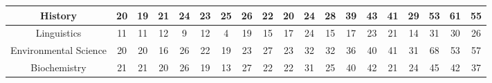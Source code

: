 \documentclass[10]{article}
\begin{document}
\begin{landscape}
\begin{longtable}[c]{|ccccccccccccccccccc|}
	\multicolumn{1}{|c|}{History}                                    & \multicolumn{1}{c|}{20}         & \multicolumn{1}{c|}{19}         & \multicolumn{1}{c|}{21}         & \multicolumn{1}{c|}{24}         & \multicolumn{1}{c|}{23}         & \multicolumn{1}{c|}{25}         & \multicolumn{1}{c|}{26}         & \multicolumn{1}{c|}{22}         & \multicolumn{1}{c|}{20}         & \multicolumn{1}{c|}{24}         & \multicolumn{1}{c|}{28}         & \multicolumn{1}{c|}{39}         & \multicolumn{1}{c|}{43}         & \multicolumn{1}{c|}{41}         & \multicolumn{1}{c|}{29}         & \multicolumn{1}{c|}{53}         & \multicolumn{1}{c|}{61}         & 55         \\ \hline
	\multicolumn{1}{|c|}{Linguistics}                                & \multicolumn{1}{c|}{11}         & \multicolumn{1}{c|}{11}         & \multicolumn{1}{c|}{12}         & \multicolumn{1}{c|}{9}          & \multicolumn{1}{c|}{12}         & \multicolumn{1}{c|}{4}          & \multicolumn{1}{c|}{19}         & \multicolumn{1}{c|}{15}         & \multicolumn{1}{c|}{17}         & \multicolumn{1}{c|}{24}         & \multicolumn{1}{c|}{15}         & \multicolumn{1}{c|}{17}         & \multicolumn{1}{c|}{23}         & \multicolumn{1}{c|}{21}         & \multicolumn{1}{c|}{14}         & \multicolumn{1}{c|}{31}         & \multicolumn{1}{c|}{30}         & 26         \\ \hline
	\multicolumn{1}{|c|}{Environmental Science}                      & \multicolumn{1}{c|}{20}         & \multicolumn{1}{c|}{20}         & \multicolumn{1}{c|}{16}         & \multicolumn{1}{c|}{26}         & \multicolumn{1}{c|}{22}         & \multicolumn{1}{c|}{19}         & \multicolumn{1}{c|}{23}         & \multicolumn{1}{c|}{27}         & \multicolumn{1}{c|}{23}         & \multicolumn{1}{c|}{32}         & \multicolumn{1}{c|}{32}         & \multicolumn{1}{c|}{36}         & \multicolumn{1}{c|}{40}         & \multicolumn{1}{c|}{41}         & \multicolumn{1}{c|}{31}         & \multicolumn{1}{c|}{68}         & \multicolumn{1}{c|}{53}         & 57         \\ \hline
	\multicolumn{1}{|c|}{Biochemistry}                               & \multicolumn{1}{c|}{21}         & \multicolumn{1}{c|}{21}         & \multicolumn{1}{c|}{20}         & \multicolumn{1}{c|}{26}         & \multicolumn{1}{c|}{19}         & \multicolumn{1}{c|}{13}         & \multicolumn{1}{c|}{27}         & \multicolumn{1}{c|}{22}         & \multicolumn{1}{c|}{22}         & \multicolumn{1}{c|}{31}         & \multicolumn{1}{c|}{25}         & \multicolumn{1}{c|}{40}         & \multicolumn{1}{c|}{42}         & \multicolumn{1}{c|}{21}         & \multicolumn{1}{c|}{24}         & \multicolumn{1}{c|}{45}         & \multicolumn{1}{c|}{42}         & 37         \\ \hline

\end{longtable}
\end{landscape}
\end{document}
